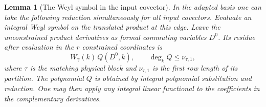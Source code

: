 \documentclass[a4paper,11pt]{article}
\newtheorem{lemma}[proposition]{Lemma}
\theoremstyle{definition}
\theoremstyle{remark}
\numberwithin{equation}{section}
\begin{document}
\begin{lemma}[The Weyl symbol in the input covector]\leavevmode
\label{lem:weylresidue500}
In the adapted basis one can take the following reduction
simultaneously for all input covectors. Evaluate an integral
Weyl symbol on the translated product at this edge. Leave the
unconstrained product derivatives as formal commuting variables
\(D^0\). Its residue after evaluation in the \(r\) constrained
coordinates is
\[
                   W_\gamma(k)\,Q(D^0,k),
        \qquad \deg_k Q\le \nu_{\tau,1},
\]
where \(\tau\) is the matching physical block and \(\nu_{\tau,1}\)
is the first row length of its partition. The polynomial \(Q\)
is obtained by integral polynomial substitution and reduction.
One may then apply any integral linear functional to the
coefficients in the complementary derivatives.
\end{lemma}
\end{document}

